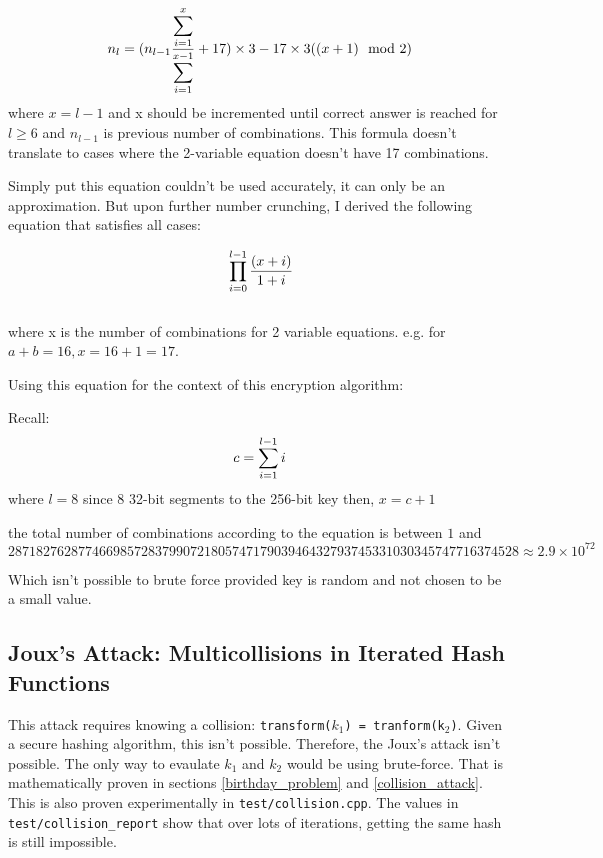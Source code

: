 \documentclass[fleqn, a4paper,12pt]{article}
\begin{document}
\[
		\\ n_l = (n_{l-1} \frac{\displaystyle \sum_{i=1}^{x}}{\displaystyle \sum_{i=1}^{x-1}} +17) \times 3 - 17 \times 3( (x+1) \mod 2 )
\]
where $x = l-1$ \quad and x should be incremented until correct answer is reached for $l \geq 6$ and $n_{l-1}$ is previous number of combinations.
This formula doesn't translate to cases where the 2-variable equation doesn't have 17 combinations.

Simply put this equation couldn't be used accurately, it can only be an approximation. But upon further number crunching, I derived the following equation that satisfies all cases:

\[
\\ \prod_{i=0}^{l-1} \frac{(x+i)}{1+i}
\]
\\
where x is the number of combinations for 2 variable equations. e.g. for $a+b = 16, x = 16+1 = 17$.

Using this equation for the context of this encryption algorithm:

Recall:
\[
\\ c = \sum_{i=1}^{l-1} i
\]
where $l=8$ since 8 32-bit segments to the 256-bit key
then, $x = c + 1$

the total number of combinations according to the equation is between $1$ and \\$2871827628774669857283799072180574717903946432793745331030345747716374528 \approx 2.9 \times 10^{72}$

Which isn't possible to brute force provided key is random and not chosen to be a small value.

\subsection{Joux's Attack: Multicollisions in Iterated Hash Functions}


This attack requires knowing a collision: \texttt{transform($k_1$) = tranform(k$_2$)}. Given a secure hashing algorithm, this isn't possible. Therefore, the Joux's attack isn't possible. The only way to evaulate $k_1$ and $k_2$ would be using brute-force. That is mathematically proven in sections \ref{birthday_problem} and \ref{collision_attack}. This is also proven experimentally in \texttt{test/collision.cpp}. The values in \texttt{test/collision\_report} show that over lots of iterations, getting the same hash is still impossible.
\end{document}
